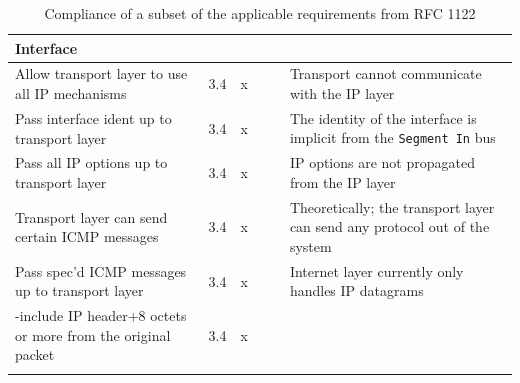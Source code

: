 \begin{longtable}{ | p{} | p{} | p{} |  p{} | p{} | p{} |}
\textbf{Interface} \\ \hline
  Allow transport layer to use all IP mechanisms &3.4     &x& & \cellcolor{red!25 } & Transport cannot communicate with the IP layer  \\ \hline
  Pass interface ident up to transport layer     &3.4     &x& & \cellcolor{yellow!25 } & The identity of the interface is implicit from the \texttt{Segment In} bus \\ \hline
  Pass all IP options up to transport layer      &3.4     &x& & \cellcolor{red!25 } & IP options are not propagated from the IP layer\\ \hline
  Transport layer can send certain ICMP messages &3.4     &x& & \cellcolor{yellow!25 } & Theoretically; the transport layer can send any protocol out of the system\\ \hline
  Pass spec'd ICMP messages up to transport layer  &3.4     &x& & \cellcolor{red!25 }& Internet layer currently only handles IP datagrams \\ \hline
   -include IP header+8 octets or more from the original packet  &3.4     &x& & \cellcolor{red!25 } & \\ \hline
\hline
\caption{Compliance of a subset of the applicable requirements from RFC 1122}
\label{tab:rfc_compliance}
\end{longtable}
\twocolumn


